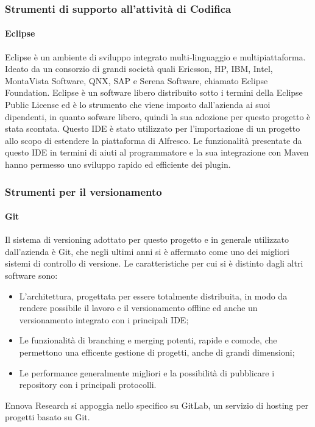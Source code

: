 \subsubsection{Strumenti di supporto all’attività di Codifica}
\paragraph{Eclipse}
Eclipse è un ambiente di sviluppo integrato multi-linguaggio e multipiattaforma. Ideato da un consorzio di grandi società quali Ericsson, HP, IBM, Intel, MontaVista Software, QNX, SAP e Serena Software, chiamato Eclipse Foundation.
Eclipse è un software libero distribuito sotto i termini della Eclipse Public License ed è lo strumento che viene imposto dall'azienda ai suoi dipendenti, in quanto sofware libero, quindi la sua adozione per questo progetto è stata scontata.
Questo IDE è stato utilizzato per l’importazione
di un progetto allo scopo di estendere la piattaforma di Alfresco. Le funzionalità
presentate da questo IDE in termini di aiuti al programmatore e la sua integrazione con Maven hanno permesso uno sviluppo rapido ed efficiente dei plugin.
\subsubsection{Strumenti per il versionamento}
\paragraph{Git}
Il sistema di versioning adottato per questo progetto e in generale utilizzato dall'azienda è Git, che negli ultimi anni si è affermato come uno
dei migliori sistemi di controllo di versione.
Le caratteristiche per cui si è distinto dagli altri software sono:
\begin{itemize}
\item L’architettura, progettata per essere totalmente distribuita, in modo da
rendere possibile il lavoro e il versionamento offline ed anche un versionamento integrato con i principali IDE;
\item Le funzionalità di branching e merging potenti, rapide e comode, che permettono una efficente gestione di progetti, anche di grandi dimensioni;
\item Le performance generalmente migliori e la possibilità di pubblicare i repository con i principali protocolli.
\end{itemize}
Ennova Research si appoggia nello specifico su GitLab, un servizio di hosting per progetti basato
su Git.
